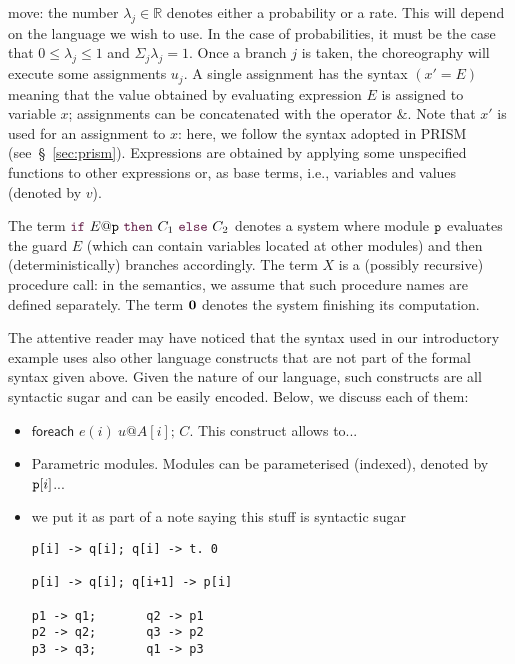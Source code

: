 move: the number $\lambda_j\in\mathbb R$ denotes either a probability
or a rate. This will depend on the language we wish to use. In the
case of probabilities, it must be the case that $0\leq\lambda_j\leq 1$
and $\Sigma_j\lambda_j=1$. Once a branch $j$ is taken, the
choreography will execute some assignments $u_j$. A single assignment
has the syntax $(x' = E)$ meaning that the value obtained by
evaluating expression $E$ is assigned to variable $x$; assignments can
be concatenated with the operator $\&$.  Note that $x'$ is used for an
assignment to $x$: here, we follow the syntax adopted in PRISM
(see~\S~\ref{sec:prism}). Expressions are obtained by applying some
unspecified functions to other expressions or, as base terms, i.e.,
variables and values (denoted by $v$).
%

The term $\ifTE {E}{p}{C_1}{C_2}$ denotes a system where module
  $\mathtt{p}$ evaluates the guard $E$ (which can contain variables
  located at other modules) and then (deterministically) branches
  accordingly.  The term $X$ is a (possibly recursive) procedure call:
  in the semantics, we assume that such procedure names are defined
  separately.  The term $\mathbf{0}$ denotes the system finishing its
  computation.

\bigskip

\begin{remark} The attentive reader may have
  noticed that the syntax used in our introductory example uses also
  other language constructs that are not part of the formal syntax
  given above. Given the nature of our language, such constructs are
  all syntactic sugar and can be easily encoded. Below, we discuss
  each of them:
  
  \begin{itemize}
    
  \item $\textsf{foreach } e(i)\ u@A[i];\, C$. This construct allows
    to...

  \item Parametric modules. Modules can be parameterised (indexed),
    denoted by $\mathtt{p}[i]$...

  \item we put it as part of a note saying this stuff is syntactic
    sugar

\begin{verbatim}
p[i] -> q[i]; q[i] -> t. 0

p[i] -> q[i]; q[i+1] -> p[i]

p1 -> q1;       q2 -> p1
p2 -> q2;       q3 -> p2
p3 -> q3;       q1 -> p3
\end{verbatim}

\end{itemize}

  
\end{remark}



